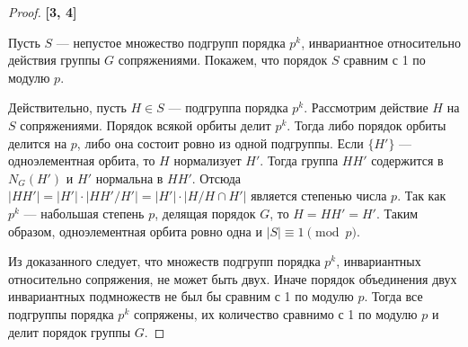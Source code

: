 \begin{proof}
	\textbf{[3, 4]}
	
	Пусть $ S $ --- непустое множество подгрупп порядка $ p^k $, 
	инвариантное относительно действия группы $ G $ сопряжениями.
	Покажем, что порядок $ S $ сравним с 1 по модулю $ p $.
	
	Действительно, пусть $ H \in S $ --- подгруппа порядка $ p^k $.
	Рассмотрим действие $ H $ на $ S $ сопряжениями. Порядок всякой орбиты делит $ p^k $.
	Тогда либо порядок орбиты делится на $ p $, либо она состоит ровно из одной подгруппы.
	Если $ \{H'\} $ --- одноэлементная орбита, то $ H $ нормализует $ H' $.
	Тогда группа $ HH' $ содержится в $ N_G(H') $ и $ H' $ нормальна в $ HH' $.
	Отсюда $ |HH'| = |H'| \cdot |HH' / H'| = |H'| \cdot |H / H \cap H'| $ является степенью числа $ p $.
	Так как $ p^k $ --- набольшая степень $ p $, делящая порядок $ G $, то $ H = HH' = H' $.
	Таким образом, одноэлементная орбита ровно одна и $ |S| \equiv 1 \pmod p $.
	
	Из доказанного следует, что множеств подгрупп порядка $ p^k $, 
	инвариантных относительно сопряжения, не может быть двух.
	Иначе порядок объединения двух инвариантных подмножеств не был бы сравним с 1 по модулю $ p $.
	Тогда все подгруппы порядка $ p^k $ сопряжены, их количество сравнимо с 1 по модулю $ p $
	и делит порядок группы $ G $.
	
\end{proof}